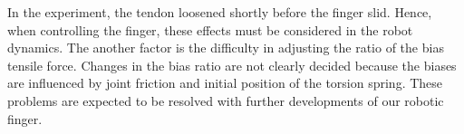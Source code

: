 \documentclass{llncs}
\begin{document}
In the experiment, the tendon loosened shortly before the finger slid.
Hence, when controlling the finger,
these effects must be considered in the robot dynamics.
The another factor is the difficulty in adjusting the ratio of the bias tensile force.
Changes in the bias ratio are not clearly decided because the biases are influenced by joint friction and initial position of the torsion spring.
These problems are expected to be resolved with further developments of our robotic finger.
\end{document}
